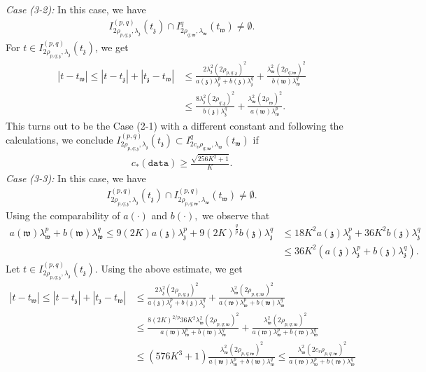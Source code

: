 \documentclass[11pt,oneside, english,reqno,twoside a4paper]{amsart}
\theoremstyle{definition}
\numberwithin{theorem}{section}
\numberwithin{equation}{section}
\newcommand{\mfz}{\mathfrak{z}}
\newcommand{\mfw}{\mathfrak{w}}
\begin{document}
\noindent \textit{Case (3-2):} In this case, we have
\begin{align*}
    I^{(p,q)}_{2\rho_{p,q; \mfz}, \lambda_{\mfz}}(t_{\mfz})\cap I^q_{2\rho_{q;\mfw}, \lambda_{\mfw}}(t_{\mfw})\neq \emptyset.
\end{align*}
For $t \in I^{(p,q)}_{2\rho_{p,q; \mfz}, \lambda_{\mfz}}(t_{\mfz})$, we get
\begin{align*}
    |t-t_{\mfw}|\leq |t-t_{\mfz}|+|t_{\mfz}-t_{\mfw}|&\leq  \frac{2 \lambda^2_{\mfz}(2 \rho_{p,q; \mfz})^2}{a(\mfz)\lambda^p_{\mfz}+b(\mfz)\lambda^q_{\mfz}}+\frac{ \lambda^2_{\mfw}(2 \rho_{q;\mfw})^2}{b(\mfw)\lambda^q_{\mfw}}\\
    &\leq \frac{8 \lambda^2_{\mfz}(2 \rho_{q;\mfz})^2}{b(\mfz)\lambda^q_{\mfz}}+\frac{ \lambda^2_{\mfw}(2 \rho_{\mfw})^2}{a(\mfw)\lambda^p_{\mfw}}.
\end{align*}
This turns out to be the Case (2-1) with a different constant and following the calculations, we conclude $I^{(p,q)}_{2\rho_{p,q; \mfz}, \lambda_{\mfz}}(t_{\mfz})\subset I^q_{2c_v\rho_{q;\mfw}, \lambda_{\mfw}}(t_{\mfw})$ if 
\begin{align}\label{c_8}
    c_*(\texttt{data})\geq \frac{\sqrt{256K^2+1}}{K}.
\end{align}
\noindent \textit{Case (3-3):} In this case, we have
\begin{align*}
    I^{(p,q)}_{2\rho_{p,q; \mfz}, \lambda_{\mfz}}(t_{\mfz})\cap I^{(p,q)}_{2\rho_{p,q;\mfw}, \lambda_{\mfw}}(t_{\mfw})\neq \emptyset.
\end{align*}
Using the comparability of $a(\cdot)$ and $b(\cdot),$ we observe that
\begin{align*}
    a(\mfw)\lambda^p_{\mfw}+b(\mfw)\lambda^q_{\mfw}\leq 9 (2K)a(\mfz)\lambda^p_{\mfz}+9(2K)^{\frac{q}{p}}b(\mfz)\lambda^q_{\mfz}&\leq 18K^2a(\mfz)\lambda^p_{\mfz}+36K^2b(\mfz)\lambda^q_{\mfz}\\
    &\leq 36K^2 \left(a(\mfz)\lambda^p_{\mfz}+b(\mfz)\lambda^q_{\mfz}\right).
\end{align*}
Let $t\in I^{(p,q)}_{2\rho_{p,q; \mfz}, \lambda_{\mfz}}(t_{\mfz}).$ Using the above estimate, we get
\begin{align*}
    |t-t_{\mfw}|\leq |t-t_{\mfz}|+|t_{\mfz}-t_{\mfw}|&\leq \frac{2 \lambda^2_{\mfz}(2 \rho_{p,q; \mfz})^2}{a(\mfz)\lambda^p_{\mfz}+b(\mfz)\lambda^q_{\mfz}}+\frac{ \lambda^2_{\mfw}(2 \rho_{p,q; \mfw})^2}{a(\mfw)\lambda^p_{\mfw}+b(\mfw)\lambda^q_{\mfw}}\\
    &\leq\frac{8(2K)^{2/p}36K^2\lambda^2_{\mfw}(2 \rho_{p,q; \mfw})^2}{a(\mfw)\lambda^p_{\mfw}+b(\mfw)\lambda^q_{\mfw}}+\frac{ \lambda^2_{\mfw}(2 \rho_{p,q; \mfw})^2}{a(\mfw)\lambda^p_{\mfw}+b(\mfw)\lambda^q_{\mfw}}\\
    &\leq \left(576K^3+1\right)\frac{ \lambda^2_{\mfw}(2 \rho_{p,q; \mfw})^2}{a(\mfw)\lambda^p_{\mfw}+b(\mfw)\lambda^q_{\mfw}}\leq \frac{ \lambda^2_{\mfw}(2 c_v\rho_{p,q; \mfw})^2}{a(\mfw)\lambda^p_{\mfw}+b(\mfw)\lambda^q_{\mfw}}
\end{align*}
\end{document}
